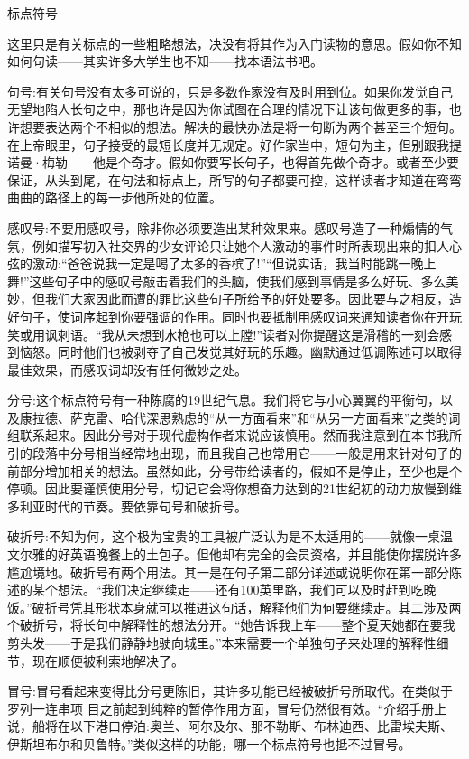 标点符号

这里只是有关标点的一些粗略想法，决没有将其作为入门读物的意思。假如你不知如何句读——其实许多大学生也不知——找本语法书吧。

句号:有关句号没有太多可说的，只是多数作家没有及时用到位。如果你发觉自己无望地陷人长句之中，那也许是因为你试图在合理的情况下让该句做更多的事，也许想要表达两个不相似的想法。解决的最快办法是将一句断为两个甚至三个短句。在上帝眼里，句子接受的最短长度并无规定。好作家当中，短句为主，但别跟我提诺曼·梅勒——他是个奇才。假如你要写长句子，也得首先做个奇才。或者至少要保证，从头到尾，在句法和标点上，所写的句子都要可控，这样读者才知道在弯弯曲曲的路径上的每一步他所处的位置。

感叹号:不要用感叹号，除非你必须要造出某种效果来。感叹号造了一种煽情的气氛，例如描写初入社交界的少女评论只让她个人激动的事件时所表现出来的扣人心弦的激动:“爸爸说我一定是喝了太多的香槟了!”“但说实话，我当时能跳一晚上舞!”这些句子中的感叹号敲击着我们的头脑，使我们感到事情是多么好玩、多么美妙，但我们大家因此而遭的罪比这些句子所给予的好处要多。因此要与之相反，造好句子，使词序起到你要强调的作用。同时也要抵制用感叹词来通知读者你在开玩笑或用讽刺语。“我从未想到水枪也可以上膛!”读者对你提醒这是滑稽的一刻会感到恼怒。同时他们也被剥夺了自己发觉其好玩的乐趣。幽默通过低调陈述可以取得最佳效果，而感叹词却没有任何微妙之处。

分号:这个标点符号有一种陈腐的19世纪气息。我们将它与小心翼翼的平衡句，以及康拉德、萨克雷、哈代深思熟虑的“从一方面看来”和“从另一方面看来”之类的词组联系起来。因此分号对于现代虚构作者来说应该慎用。然而我注意到在本书我所引的段落中分号相当经常地出现，而且我自己也常用它——一般是用来针对句子的前部分增加相关的想法。虽然如此，分号带给读者的，假如不是停止，至少也是个停顿。因此要谨慎使用分号，切记它会将你想奋力达到的21世纪初的动力放慢到维多利亚时代的节奏。要依靠句号和破折号。

破折号:不知为何，这个极为宝贵的工具被广泛认为是不太适用的——就像一桌温文尔雅的好英语晚餐上的土包子。但他却有完全的会员资格，并且能使你摆脱许多尴尬境地。破折号有两个用法。其一是在句子第二部分详述或说明你在第一部分陈述的某个想法。“我们决定继续走——还有100英里路，我们可以及时赶到吃晚饭。”破折号凭其形状本身就可以推进这句话，解释他们为何要继续走。其二涉及两个破折号，将长句中解释性的想法分开。“她告诉我上车——整个夏天她都在要我剪头发——于是我们静静地驶向城里。”本来需要一个单独句子来处理的解释性细节，现在顺便被利索地解决了。

冒号:冒号看起来变得比分号更陈旧，其许多功能已经被破折号所取代。在类似于罗列一连串项 目之前起到纯粹的暂停作用方面，冒号仍然很有效。“介绍手册上说，船将在以下港口停泊:奥兰、阿尔及尔、那不勒斯、布林迪西、比雷埃夫斯、伊斯坦布尔和贝鲁特。”类似这样的功能，哪一个标点符号也抵不过冒号。

